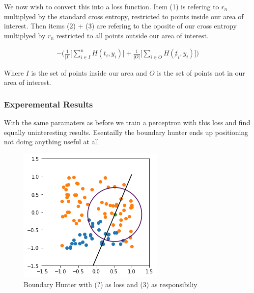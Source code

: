 \documentclass{article}
\begin{document}
We now wish to convert this into a loss function. Item (1) is refering to $r_n$ multiplyed by the standard cross entropy, restricted to points inside our area of interest. Then items (2) + (3) are refering to the oposite of our cross entropy multiplyed by $r_n$ restricted to all points outside our area of interest.

\begin{align}
- \big( \frac{1}{|I|} \big[ \sum_{i \in I}^n H(t_i, y_i) \big] + \frac{1}{|O|} \big[ \sum_{i \in O} H(\not t_i, y_i) \big] \big)
\end{align}

Where $I$ is the set of points inside our area and $O$ is the set of points not in our area of interest.

\subsubsection{Experemental Results}

With the same paramaters as before we train a perceptron with this loss and find equally uninteresting results. Esentailly the boundary hunter ends up positioning not doing anything useful at all

\begin{figure}[H]
\centering
  \begin{minipage}[b]{0.4\textwidth}
    \includegraphics[width=\textwidth]{BoundaryHunter-Attempt2-01.png}
    \caption{Boundary Hunter with (?) as loss and (3) as responsibiliy}
  \end{minipage}
  \hfill
\end{figure}
\end{document}
